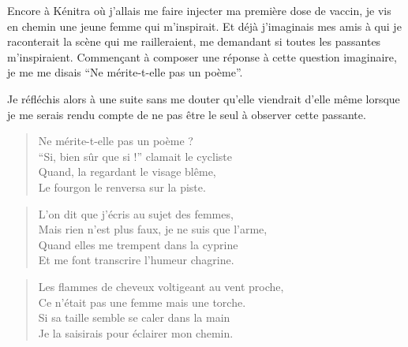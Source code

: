 \begin{prose}
  Encore à Kénitra où j’allais me faire injecter ma première dose de vaccin, je vis en  chemin une jeune femme qui m’inspirait. Et déjà j’imaginais mes amis à qui je raconterait la scène qui me railleraient, me demandant si toutes les passantes m’inspiraient. Commençant à composer une réponse à cette question imaginaire, je me me disais \enquote{Ne mérite-t-elle pas un poème}.

  Je réfléchis alors à une  suite sans me douter qu’elle viendrait d’elle même lorsque je me serais rendu compte de ne pas être le seul à observer cette passante.
\end{prose}

\begin{verse}%
  \quatrain%
  Ne mérite-t-elle pas un poème ?\\  %
  \enquote{Si, bien sûr que si !} clamait le cycliste\\  %
  Quand, la regardant le visage blême,\\  %
  Le fourgon le renversa sur la piste.
\end{verse}


\begin{verse}%
  \quatrain%
  L’on dit que j’écris au sujet des femmes,\\  %
  Mais rien n’est plus faux, je ne suis que l’arme,\\  %
  Quand elles me trempent dans la cyprine\\  %
  Et me font transcrire l’humeur chagrine.
\end{verse}

\begin{verse}%
  \quatrain%
  Les flammes de cheveux voltigeant au vent proche,\\  %
  Ce n’était pas une femme mais une torche.\\  %
  Si sa taille semble se caler dans la main\\  %
  Je la saisirais pour éclairer mon chemin.
\end{verse}

